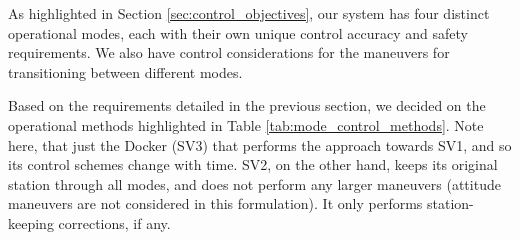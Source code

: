 As highlighted in Section \ref{sec:control_objectives}, our system has four distinct operational modes, each with their own unique control accuracy and safety requirements. We also have control considerations for the maneuvers for transitioning between different modes.

Based on the requirements detailed in the previous section, we decided on the operational methods highlighted in Table \ref{tab:mode_control_methods}. Note here, that just the Docker (SV3) that performs the approach towards SV1, and so its control schemes change with time. SV2, on the other hand, keeps its original station through all modes, and does not perform any larger maneuvers (attitude maneuvers are not considered in this formulation). It only performs station-keeping corrections, if any.


